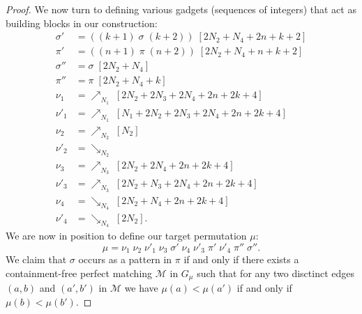 \documentclass[a4paper,10pt]{llncs}
\begin{document}
\begin{proof}
  We now turn to defining various gadgets (sequences of integers)
  that act as building blocks in our construction:
  \begin{align*}
  \sigma'  &= ((k+1) \; \sigma \; (k+2)) \; [2N_2 + N_4 + 2n + k + 2] \\
  \pi'     &= ((n+1) \; \pi \; (n+2)) \; [2N_2 + N_4 + n + k + 2] \\
  \sigma'' &= \sigma \; [2N_2 + N_4] \\
  \pi''    &= \pi \; [2N_2 + N_4 + k] \\
  \nu_1    &= \nearrow_{N_1} \; [2N_2 + 2N_3 + 2N_4 + 2n + 2k + 4] \\
  \nu'_1   &= \nearrow_{N_1} \; [N_1 + 2N_2 + 2N_3 + 2N_4 + 2n + 2k + 4] \\
  \nu_2    &= \nearrow_{N_2} \; [N_2] \\
  \nu'_2   &= \searrow_{N_2} \\
  \nu_3    &= \nearrow_{N_3} \; [2N_2 + 2N_4 + 2n + 2k + 4] \\
  \nu'_3   &= \nearrow_{N_3} \; [2N_2 + N_3 + 2N_4 + 2n + 2k + 4] \\
  \nu_4    &= \searrow_{N_4} \; [2N_2 + N_4 + 2n + 2k + 4] \\
  \nu'_4   &= \searrow_{N_4} \; [2N_2]\text{.}
  \end{align*}
  We are now in position to define our target permutation $\mu$:
  $$
  \mu
  =
  \nu_1 \; \nu_2 \; \nu'_1 \; \nu_3 \; \sigma' \; \nu_4 \; \nu'_3 \; \pi' \; \nu'_4 \; \pi'' \; \sigma''
  \text{.}
  $$
  We claim that $\sigma$ occurs as a pattern in $\pi$ if and only if
  there exists a containment-free perfect matching
  $\mathcal{M}$ in $G_\mu$ such that
  for any two disctinct edges
  $(a, b)$ and $(a', b')$ in $\mathcal{M}$
  we have $\mu(a) < \mu(a')$ if and only if $\mu(b) < \mu(b')$.


\end{proof}
\end{document}
